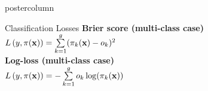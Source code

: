 \documentclass{beamer}
\begin{document}
\begin{frame}[fragile]{}
\begin{columns}
\begin{column}{.31\textwidth}
\begin{beamercolorbox}[center]{postercolumn}
\begin{minipage}{.98\textwidth}
{\begin{myblock}{Classification Losses}
\textbf{Brier score (multi-class case)} \\
$L\left(y, \pi(\mathbf{x})\right) =  \sum\limits_{k=1}^g (\pi_{k}(\mathbf{x}) - o_k)^2$ \\

\textbf{Log-loss (multi-class case)} \\
$ L\left(y, \pi(\mathbf{x})\right) =  - \sum\limits_{k=1}^g o_k \log(\pi_{k}(\mathbf{x}))$  %


\end{myblock}

%             


  





}
\end{minipage}
\end{beamercolorbox}
\end{column}
\end{columns}
\end{frame}
\end{document}
